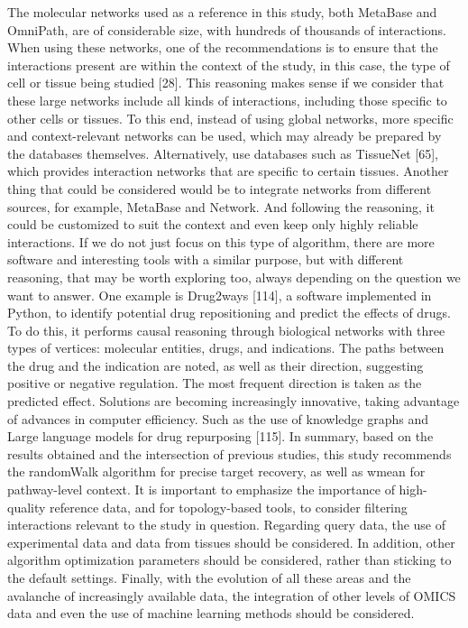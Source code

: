 The molecular networks used as a reference in this study, both MetaBase and OmniPath, are of considerable size, with hundreds of thousands of interactions. When using these networks, one of the recommendations is to ensure that the interactions present are within the context of the study, in this case, the type of cell or tissue being studied [28]. This reasoning makes sense if we consider that these large networks include all kinds of interactions, including those specific to other cells or tissues. To this end, instead of using global networks, more specific and context-relevant networks can be used, which may already be prepared by the databases themselves. Alternatively, use databases such as TissueNet [65], which provides interaction networks that are specific to certain tissues. Another thing that could be considered would be to integrate networks from different sources, for example, MetaBase and Network. And following the reasoning, it could be customized to suit the context and even keep only highly reliable interactions. 
If we do not just focus on this type of algorithm, there are more software and interesting tools with a similar purpose, but with different reasoning, that may be worth exploring too, always depending on the question we want to answer. One example is Drug2ways [114], a software implemented in Python, to identify potential drug repositioning and predict the effects of drugs. To do this, it performs causal reasoning through biological networks with three types of vertices: molecular entities, drugs, and indications. The paths between the drug and the indication are noted, as well as their direction, suggesting positive or negative regulation. The most frequent direction is taken as the predicted effect. Solutions are becoming increasingly innovative, taking advantage of advances in computer efficiency. Such as the use of knowledge graphs and Large language models for drug repurposing [115]. 
In summary, based on the results obtained and the intersection of previous studies, this study recommends the randomWalk algorithm for precise target recovery, as well as wmean for pathway-level context. It is important to emphasize the importance of high-quality reference data, and for topology-based tools, to consider filtering interactions relevant to the study in question. Regarding query data, the use of experimental data and data from tissues should be considered. In addition, other algorithm optimization parameters should be considered, rather than sticking to the default settings. Finally, with the evolution of all these areas and the avalanche of increasingly available data, the integration of other levels of OMICS data and even the use of machine learning methods should be considered.
